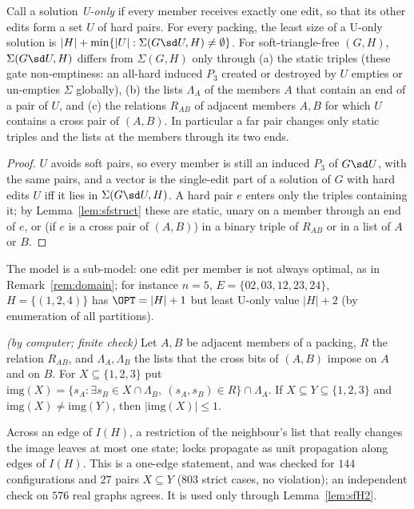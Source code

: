 \begin{lemma}\label{lem:sfU}
Call a solution \emph{U-only} if every member receives exactly one edit, so that its other edits form a set $U$ of hard pairs. For every packing, the least size of a U-only solution is $|H|+\min\{|U|:\Sigma(G\sd U,H)\ne\emptyset\}$. For soft-triangle-free $(G,H)$, $\Sigma(G\sd U,H)$ differs from $\Sigma(G,H)$ only through (a) the static triples (these gate non-emptiness: an all-hard induced $P_3$ created or destroyed by $U$ empties or un-empties $\Sigma$ globally), (b) the lists $\Lambda_A$ of the members $A$ that contain an end of a pair of $U$, and (c) the relations $R_{AB}$ of adjacent members $A,B$ for which $U$ contains a cross pair of $(A,B)$. In particular a far pair changes only static triples and the lists at the members through its two ends.
\end{lemma}
\begin{proof}
$U$ avoids soft pairs, so every member is still an induced $P_3$ of $G\sd U$, with the same pairs, and a vector is the single-edit part of a solution of $G$ with hard edits $U$ iff it lies in $\Sigma(G\sd U,H)$. A hard pair $e$ enters only the triples containing it; by Lemma~\ref{lem:sfstruct} these are static, unary on a member through an end of $e$, or (if $e$ is a cross pair of $(A,B)$) in a binary triple of $R_{AB}$ or in a list of $A$ or $B$.
\end{proof}
The model is a sub-model: one edit per member is not always optimal, as in Remark~\ref{rem:domain}; for instance $n=5$, $E=\{02,03,12,23,24\}$, $H=\{(1,2,4)\}$ has $\OPT=|H|+1$ but least U-only value $|H|+2$ (by enumeration of all partitions).

\begin{lemma}[Strictness]\label{lem:sfS}
\emph{(by computer; finite check)} Let $A,B$ be adjacent members of a packing, $R$ the relation $R_{AB}$, and $\Lambda_A,\Lambda_B$ the lists that the cross bits of $(A,B)$ impose on $A$ and on $B$. For $X\subseteq\{1,2,3\}$ put $\mathrm{img}(X)=\{s_A:\exists s_B\in X\cap\Lambda_B,\ (s_A,s_B)\in R\}\cap\Lambda_A$. If $X\subseteq Y\subseteq\{1,2,3\}$ and $\mathrm{img}(X)\ne\mathrm{img}(Y)$, then $|\mathrm{img}(X)|\le1$.
\end{lemma}
Across an edge of $I(H)$, a restriction of the neighbour's list that really changes the image leaves at most one state; locks propagate as unit propagation along edges of $I(H)$. This is a one-edge statement, and was checked for $144$ configurations and $27$ pairs $X\subseteq Y$ ($803$ strict cases, no violation); an independent check on $576$ real graphs agrees. It is used only through Lemma~\ref{lem:sfH2}.


